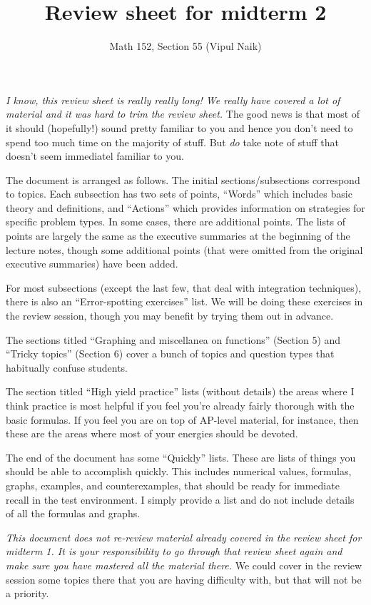 \documentclass[10pt]{amsart}
\title{Review sheet for midterm 2}
\author{Math 152, Section 55 (Vipul Naik)}
\begin{document}
\maketitle

{\em I know, this review sheet is really really long! We really have
covered a lot of material and it was hard to trim the review sheet.}
The good news is that most of it should (hopefully!) sound pretty
familiar to you and hence you don't need to spend too much time on the
majority of stuff. But {\em do} take note of stuff that doesn't seem
immediatel familiar to you.

The document is arranged as follows. The initial sections/subsections
correspond to topics. Each subsection has two sets of points,
``Words'' which includes basic theory and definitions, and ``Actions''
which provides information on strategies for specific problem
types. In some cases, there are additional points. The lists of points
are largely the same as the executive summaries at the beginning of
the lecture notes, though some additional points (that were omitted
from the original executive summaries) have been added.

For most subsections (except the last few, that deal with integration
techniques), there is also an ``Error-spotting exercises'' list. We
will be doing these exercises in the review session, though you may
benefit by trying them out in advance.

The sections titled ``Graphing and miscellanea on functions'' (Section
5) and ``Tricky topics'' (Section 6) cover a bunch of topics and
question types that habitually confuse students.

The section titled ``High yield practice'' lists (without details) the
areas where I think practice is most helpful if you feel you're
already fairly thorough with the basic formulas. If you feel you are
on top of AP-level material, for instance, then these are the areas
where most of your energies should be devoted.

The end of the document has some ``Quickly'' lists. These are lists of
things you should be able to accomplish quickly. This includes
numerical values, formulas, graphs, examples, and counterexamples,
that should be ready for immediate recall in the test environment. I
simply provide a list and do not include details of all the formulas
and graphs.



{\em This document does not re-review material already covered in the
review sheet for midterm 1. It is your responsibility to go through
that review sheet again and make sure you have mastered all the
material there.} We could cover in the review session some topics
there that you are having difficulty with, but that will not be a
priority.
\end{document}
